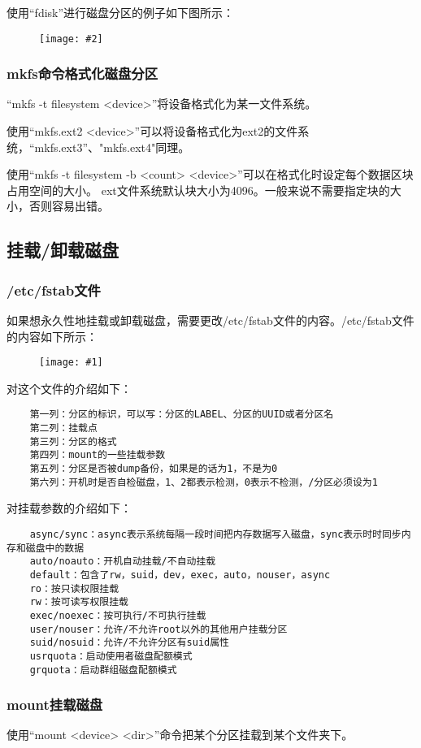\documentclass[a4paper,left=2.5cm,right=2.5cm,11pt]{article}
\newcommand{\fic}[1]{\begin{figure}[H]
		\center
		\texttt{[image: \#1]}
	\end{figure}}
\newcommand{\sizedfic}[2]{\begin{figure}[H]
		\center
		\texttt{[image: \#2]}
	\end{figure}}
\begin{document}
	使用“fdisk”进行磁盘分区的例子如下图所示：
	\sizedfic{0.65}{5.png}

\subsubsection{mkfs命令格式化磁盘分区}
	“mkfs -t filesystem <device>”将设备格式化为某一文件系统。\par

	使用“mkfs.ext2 <device>”可以将设备格式化为ext2的文件系统，“mkfs.ext3”、"mkfs.ext4"同理。\par

	使用“mkfs -t filesystem -b <count> <device>”可以在格式化时设定每个数据区块占用空间的大小。
	ext文件系统默认块大小为4096。一般来说不需要指定块的大小，否则容易出错。

\subsection{挂载/卸载磁盘}
\subsubsection{/etc/fstab文件}
	如果想永久性地挂载或卸载磁盘，需要更改/etc/fstab文件的内容。/etc/fstab文件的内容如下所示：
	\fic{6.png}

	对这个文件的介绍如下：
	\begin{lstlisting}
	第一列：分区的标识，可以写：分区的LABEL、分区的UUID或者分区名
	第二列：挂载点
	第三列：分区的格式
	第四列：mount的一些挂载参数
	第五列：分区是否被dump备份，如果是的话为1，不是为0
	第六列：开机时是否自检磁盘，1、2都表示检测，0表示不检测，/分区必须设为1
	\end{lstlisting}

	对挂载参数的介绍如下：
	\begin{lstlisting}
	async/sync：async表示系统每隔一段时间把内存数据写入磁盘，sync表示时时同步内存和磁盘中的数据
	auto/noauto：开机自动挂载/不自动挂载
	default：包含了rw，suid，dev，exec，auto，nouser，async
	ro：按只读权限挂载
	rw：按可读写权限挂载
	exec/noexec：按可执行/不可执行挂载
	user/nouser：允许/不允许root以外的其他用户挂载分区
	suid/nosuid：允许/不允许分区有suid属性
	usrquota：启动使用者磁盘配额模式
	grquota：启动群组磁盘配额模式
	\end{lstlisting}

\subsubsection{mount挂载磁盘}
	使用“mount <device> <dir>”命令把某个分区挂载到某个文件夹下。\par
\end{document}

